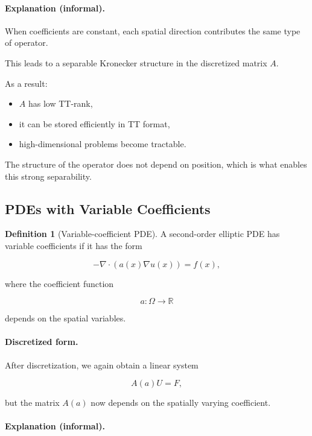 \documentclass[11pt,a4paper,parskip=half-]{scrartcl}
\theoremstyle{definition}
\newtheorem{definition}{Definition}[section]
\theoremstyle{plain}
\theoremstyle{remark}
\begin{document}
\paragraph{Explanation (informal).}

When coefficients are constant, each spatial direction contributes the same type
of operator.

This leads to a separable Kronecker structure in the discretized matrix $A$.

As a result:

\begin{itemize}
  \item $A$ has low TT-rank,
  \item it can be stored efficiently in TT format,
  \item high-dimensional problems become tractable.
\end{itemize}

The structure of the operator does not depend on position, which is what enables
this strong separability.

\subsection{PDEs with Variable Coefficients}
\begin{definition}[Variable-coefficient PDE]

  A second-order elliptic PDE has variable coefficients if it has the form

  \[
    -\nabla \cdot (a(x)\nabla u(x)) = f(x),
  \]

  where the coefficient function

  \[
    a : \Omega \to \mathbb{R}
  \]

  depends on the spatial variables.
\end{definition}
\paragraph{Discretized form.}

After discretization, we again obtain a linear system

\[
  A(a) U = F,
\]

but the matrix $A(a)$ now depends on the spatially varying coefficient.

\paragraph{Explanation (informal).}
\end{document}
